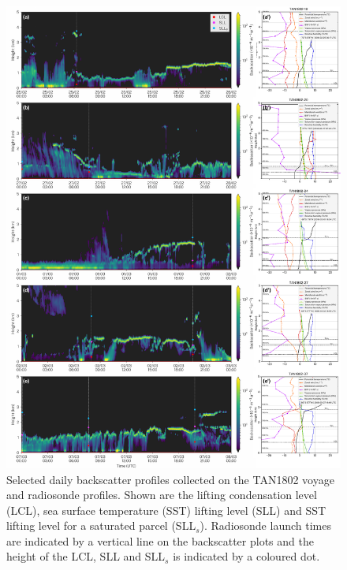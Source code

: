 \begin{figure}[p]
\centering
\includegraphics[width=\textwidth]{chapter4/fig/backscatter_rs.pdf}
\caption[Selected daily backscatter profiles collected on the TAN1802 voyage
and radiosonde profiles]{Selected daily backscatter profiles collected on the TAN1802 voyage
and radiosonde profiles. Shown are the lifting condensation level (LCL),
sea surface temperature (SST) lifting level (SLL) and SST lifting level for a saturated parcel (SLL$_s$).
Radiosonde launch times are indicated by a vertical line on the backscatter
plots and the height of the LCL, SLL and SLL$_s$ is indicated by a coloured dot.
}
\label{fig:4:backscatter-rs}
\end{figure}

